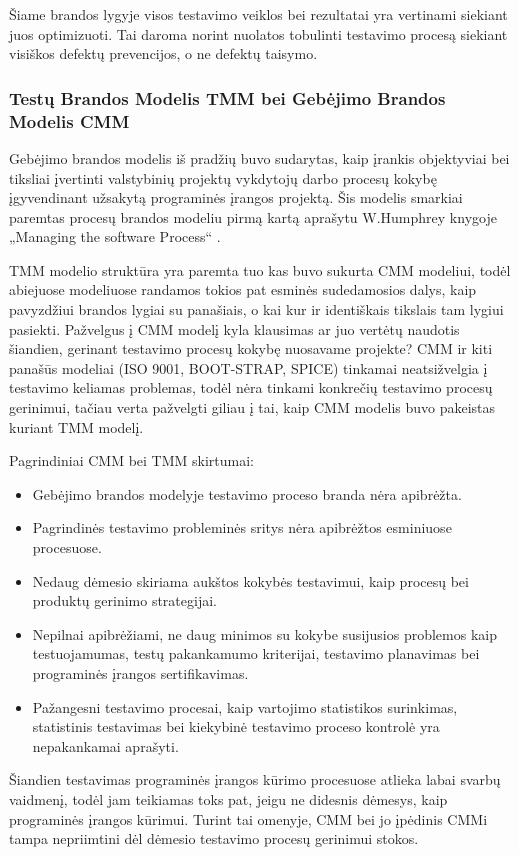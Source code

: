 \documentclass{VUMIFPSkursinis}
\begin{document}
Šiame brandos lygyje visos testavimo veiklos bei rezultatai yra vertinami siekiant juos optimizuoti. Tai daroma norint nuolatos tobulinti testavimo procesą siekiant visiškos defektų prevencijos, o ne defektų taisymo.

\subsubsection{Testų Brandos Modelis TMM bei Gebėjimo Brandos Modelis CMM}
Gebėjimo brandos modelis iš pradžių buvo sudarytas, kaip įrankis objektyviai bei tiksliai įvertinti valstybinių projektų vykdytojų darbo procesų kokybę įgyvendinant užsakytą programinės įrangos projektą. Šis modelis smarkiai paremtas procesų brandos modeliu pirmą kartą aprašytu W.Humphrey knygoje „Managing the software Process“  \cite{Paulk:1993:CMM:624600.625307}.

TMM modelio struktūra yra paremta tuo kas buvo sukurta CMM modeliui, todėl abiejuose modeliuose randamos tokios pat esminės sudedamosios dalys, kaip pavyzdžiui brandos lygiai su panašiais, o kai kur ir identiškais tikslais tam lygiui pasiekti. Pažvelgus į CMM modelį kyla klausimas ar juo vertėtų naudotis šiandien, gerinant testavimo procesų kokybę nuosavame projekte? CMM ir kiti panašūs modeliai (ISO 9001, BOOT-STRAP, SPICE) tinkamai neatsižvelgia į testavimo keliamas problemas, todėl nėra tinkami konkrečių testavimo procesų gerinimui, tačiau verta pažvelgti giliau į tai, kaip CMM modelis buvo pakeistas kuriant TMM modelį.

Pagrindiniai CMM bei TMM skirtumai:
\begin{itemize}
   \item Gebėjimo brandos modelyje testavimo proceso branda nėra apibrėžta.
   \item Pagrindinės testavimo probleminės sritys nėra apibrėžtos esminiuose procesuose.
   \item Nedaug dėmesio skiriama aukštos kokybės testavimui, kaip procesų bei produktų gerinimo strategijai.
   \item Nepilnai apibrėžiami, ne daug minimos su kokybe susijusios problemos kaip testuojamumas, testų pakankamumo kriterijai, testavimo planavimas bei programinės įrangos sertifikavimas.
   \item Pažangesni testavimo procesai, kaip vartojimo statistikos surinkimas, statistinis testavimas bei kiekybinė testavimo proceso kontrolė yra nepakankamai aprašyti.
\end{itemize}
\bigskip
Šiandien testavimas programinės įrangos kūrimo procesuose atlieka labai svarbų vaidmenį, todėl jam teikiamas toks pat, jeigu ne didesnis dėmesys, kaip programinės įrangos kūrimui. Turint tai omenyje, CMM bei jo įpėdinis CMMi tampa nepriimtini dėl dėmesio testavimo procesų gerinimui stokos.
\end{document}

